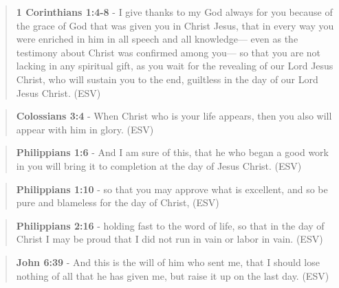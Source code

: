 \documentclass[11pt]{article}
\begin{document}
\begin{quote}
\textbf{1 Corinthians 1:4-8} - I give thanks to my God always for you because of the grace of God that was given you in Christ Jesus, that in every way you were enriched in him in all speech and all knowledge— even as the testimony about Christ was confirmed among you— so that you are not lacking in any spiritual gift, as you wait for the revealing of our Lord Jesus Christ, who will sustain you to the end, guiltless in the day of our Lord Jesus Christ. (ESV)
\end{quote}

\begin{quote}
\textbf{Colossians 3:4} - When Christ who is your life appears, then you also will appear with him in glory. (ESV)
\end{quote}

\begin{quote}
\textbf{Philippians 1:6} - And I am sure of this, that he who began a good work in you will bring it to completion at the day of Jesus Christ. (ESV)
\end{quote}

\begin{quote}
\textbf{Philippians 1:10} - so that you may approve what is excellent, and so be pure and blameless for the day of Christ, (ESV)
\end{quote}

\begin{quote}
\textbf{Philippians 2:16} - holding fast to the word of life, so that in the day of Christ I may be proud that I did not run in vain or labor in vain. (ESV)
\end{quote}

\begin{quote}
\textbf{John 6:39} -  And this is the will of him who sent me, that I should lose nothing of all that he has given me, but raise it up on the last day.  (ESV)
\end{quote}
\end{document}
